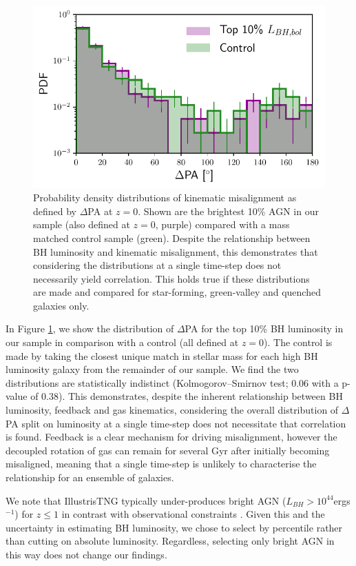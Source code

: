 \documentclass[fleqn,usenatbib]{mnras}
\begin{document}
\begin{figure}
	\includegraphics[width=0.9\linewidth]{overall_population/PA_distribution_BHlum_split.pdf}
    \caption{Probability density distributions of kinematic misalignment as defined by $\Delta$PA at $z=0$. Shown are the brightest 10\% AGN in our sample (also defined at $z=0$, purple) compared with a mass matched control sample (green). Despite the relationship between BH luminosity and kinematic misalignment, this demonstrates that considering the distributions at a single time-step does not necessarily yield correlation. This holds true if these distributions are made and compared for star-forming, green-valley and quenched galaxies only.}
    \label{fig:PAdist}
\end{figure}

In Figure \ref{fig:PAdist}, we show the distribution of $\Delta$PA for the top 10\% BH luminosity in our sample in comparison with a control (all defined at $z=0$). The control is made by taking the closest unique match in stellar mass for each high BH luminosity galaxy from the remainder of our sample. We find the two distributions are statistically indistinct (Kolmogorov--Smirnov test; 0.06 with a p-value of 0.38). This demonstrates, despite the inherent relationship between BH luminosity, feedback and gas kinematics, considering the overall distribution of $\Delta$PA split on luminosity at a single time-step does not necessitate that correlation is found. Feedback is a clear mechanism for driving misalignment, however the decoupled rotation of gas can remain for several Gyr after initially becoming misaligned, meaning that a single time-step is unlikely to characterise the relationship for an ensemble of galaxies. 

We note that IllustrisTNG typically under-produces bright AGN ($L_{BH} > 10^{44}$ergs$^{-1}$) for $z \leq 1$ in contrast with observational constraints \citep[see][]{habouzit2019}. Given this and the uncertainty in estimating BH luminosity, we chose to select by percentile rather than cutting on absolute luminosity. Regardless, selecting only bright AGN in this way does not change our findings.
\end{document}
